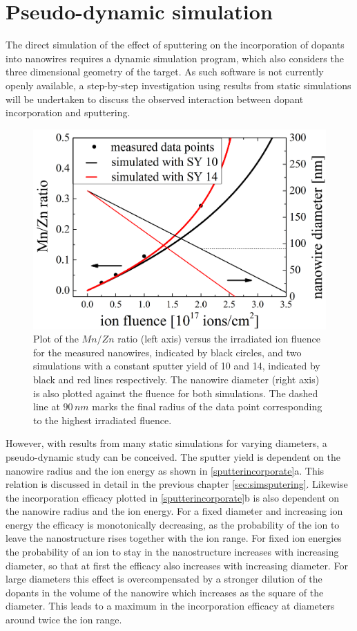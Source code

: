 \section{Pseudo-dynamic simulation}

The direct simulation of the effect of sputtering on the incorporation of dopants into nanowires requires a dynamic simulation program, which also considers the three dimensional geometry of the target. As such software is not currently openly available, a step-by-step investigation using results from static simulations will be undertaken to discuss the observed interaction between dopant incorporation and sputtering.

\begin{figure}
	\centering
		\includegraphics[width=.5\textwidth]{images/staticsputteryield.png}
	\caption{Plot of the $Mn/Zn$ ratio (left axis) versus the irradiated ion fluence for the measured nanowires, indicated by black circles, and two simulations with a constant sputter yield of 10 and 14, indicated by black and red lines respectively. The nanowire diameter (right axis) is also plotted against the fluence for both simulations. The dashed line at $90\,nm$ marks the final radius of the data point corresponding to the highest irradiated fluence.}
	\label{staticsputter}
\end{figure} 



However, with results from many static simulations for varying diameters, a pseudo-dynamic study can be conceived. The sputter yield is dependent on the nanowire radius and the ion energy as shown in \ref{sputterincorporate}a. This relation is discussed in detail in the previous chapter \ref{sec:simsputering}. Likewise the incorporation efficacy plotted in \ref{sputterincorporate}b is also dependent on the nanowire radius and the ion energy. For a fixed diameter and increasing ion energy the efficacy is monotonically decreasing, as the probability of the ion to leave the nanostructure rises together with the ion range. For fixed ion energies the probability of an ion to stay in the nanostructure increases with increasing diameter, so that at first the efficacy also increases with increasing diameter. For large diameters this effect is overcompensated by a stronger dilution of the dopants in the volume of the nanowire which increases as the square of the diameter. This leads to a maximum in the incorporation efficacy at diameters around twice the ion range. 

